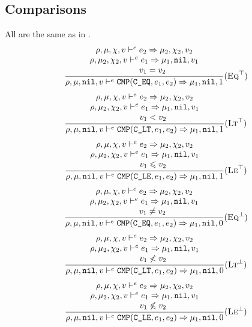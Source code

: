 \subsection{Comparisons}
All are the same as in \Cmm.
\[\dfrac{\begin{array}{c}
    \rho,\mu,\chi,v \vdash^e e_2\Rightarrow \mu_2,\chi_2,v_2 \\
    \rho,\mu_2,\chi_2,v \vdash^e e_1\Rightarrow \mu_1,\texttt{nil},v_1 \\
    \qquad v_1 = v_2
\end{array}}{\rho,\mu,\texttt{nil},v \vdash^e \texttt{CMP}(\texttt{C\_EQ}, e_1, e_2) \Rightarrow \mu_1,\texttt{nil},1}(\textsc{Eq}^\top)\]
\[\dfrac{\begin{array}{c}
    \rho,\mu,\chi,v \vdash^e e_2\Rightarrow \mu_2,\chi_2,v_2 \\
    \rho,\mu_2,\chi_2,v \vdash^e e_1\Rightarrow \mu_1,\texttt{nil},v_1 \\
    \qquad v_1 < v_2
\end{array}}{\rho,\mu,\texttt{nil},v \vdash^e \texttt{CMP}(\texttt{C\_LT}, e_1, e_2) \Rightarrow \mu_1,\texttt{nil},1}(\textsc{Lt}^\top)\]
\[\dfrac{\begin{array}{c}
    \rho,\mu,\chi,v \vdash^e e_2\Rightarrow \mu_2,\chi_2,v_2 \\
    \rho,\mu_2,\chi_2,v \vdash^e e_1\Rightarrow \mu_1,\texttt{nil},v_1 \\
    \qquad v_1 \leqslant v_2
\end{array}}{\rho,\mu,\texttt{nil},v \vdash^e \texttt{CMP}(\texttt{C\_LE}, e_1, e_2) \Rightarrow \mu_1,\texttt{nil},1}(\textsc{Le}^\top)\]
\[\dfrac{\begin{array}{c}
    \rho,\mu,\chi,v \vdash^e e_2\Rightarrow \mu_2,\chi_2,v_2 \\
    \rho,\mu_2,\chi_2,v \vdash^e e_1\Rightarrow \mu_1,\texttt{nil},v_1 \\
    \qquad v_1 \ne v_2
\end{array}}{\rho,\mu,\texttt{nil},v \vdash^e \texttt{CMP}(\texttt{C\_EQ}, e_1, e_2) \Rightarrow \mu_1,\texttt{nil},0}(\textsc{Eq}^\bot)\]
\[\dfrac{\begin{array}{c}
    \rho,\mu,\chi,v \vdash^e e_2\Rightarrow \mu_2,\chi_2,v_2 \\
    \rho,\mu_2,\chi_2,v \vdash^e e_1\Rightarrow \mu_1,\texttt{nil},v_1 \\
    \qquad v_1 \not< v_2
\end{array}}{\rho,\mu,\texttt{nil},v \vdash^e \texttt{CMP}(\texttt{C\_LT}, e_1, e_2) \Rightarrow \mu_1,\texttt{nil},0}(\textsc{Lt}^\bot)\]
\[\dfrac{\begin{array}{c}
    \rho,\mu,\chi,v \vdash^e e_2\Rightarrow \mu_2,\chi_2,v_2 \\
    \rho,\mu_2,\chi_2,v \vdash^e e_1\Rightarrow \mu_1,\texttt{nil},v_1 \\
    \qquad v_1 \not\leqslant v_2
\end{array}}{\rho,\mu,\texttt{nil},v \vdash^e \texttt{CMP}(\texttt{C\_LE}, e_1, e_2) \Rightarrow \mu_1,\texttt{nil},0}(\textsc{Le}^\bot)\]

